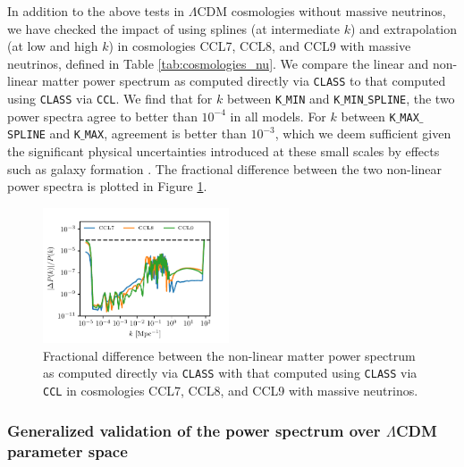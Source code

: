 \documentclass[\docopts]{\docclass}
\newcommand{\ccl}{{\tt CCL}\xspace}
\newcommand{\class}{{\tt CLASS}\xspace}
\begin{document}
In addition to the above tests in $\Lambda$CDM cosmologies without massive neutrinos, we have checked the impact of using splines (at intermediate $k$) and extrapolation (at low and high $k$) in cosmologies CCL7, CCL8, and CCL9 with massive neutrinos, defined in Table \ref{tab:cosmologies_nu}. We compare the linear and non-linear matter power spectrum as computed directly via \class to that computed using \class via \ccl . We find that for $k$  between {\tt K$\_$MIN} and {\tt K$\_$MIN$\_$SPLINE}, the two power spectra agree to better than $10^{-4}$ in all models. For $k$ between {\tt K$\_$MAX$\_$SPLINE} and {\tt K$\_$MAX}, agreement is better than $10^{-3}$, which we deem sufficient given the significant physical uncertainties introduced at these small scales by effects such as galaxy formation \citep{vanDaalen11}. The fractional difference between the two non-linear power spectra is plotted in Figure \ref{fig:power_nu}. 

\begin{figure}
\centering
\includegraphics[width=0.49\textwidth]{pk_class_nu_NL}
\caption{Fractional difference between the non-linear matter power spectrum as computed directly via \class with that computed using \class via \ccl in cosmologies CCL7, CCL8, and CCL9 with massive neutrinos.}
\label{fig:power_nu}
\end{figure}

\subsubsection{Generalized validation of the power spectrum over $\Lambda$CDM parameter space}
\label{ss:classval2}
\end{document}
